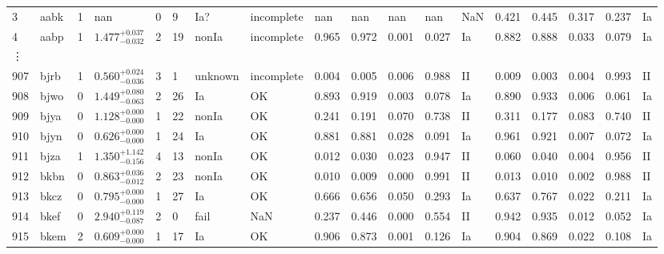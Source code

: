 \documentclass[useamsfonts]{pasj01}
\begin{document}
\begin{table}[ht]
{\begin{tabular}{p{1.5em}p{1em}p{1em}p{4.0em}p{1.5em}p{0.6em}p{3.0em}p{4.5em}|p{2.9em}|p{1.3em}p{1.3em}p{1.3em}p{1em}|p{2.9em}|p{1.3em}p{1.3em}p{1.3em}p{1em}}
3    &  aabk &     1 &      nan &         0 &    9 &    Ia? &   incomplete &      nan &      nan &      nan &      nan &     NaN &    0.421 &    0.445 &    0.317 &    0.237 &      Ia \\
4    &  aabp &     1 &    $1.477_{-0.032}^{+0.037}$ &         2 &   19 &  nonIa &   incomplete &    0.965 &    0.972 &    0.001 &    0.027 &      Ia &    0.882 &    0.888 &    0.033 &    0.079 &      Ia \\
\vdots & & & & & & & & & & & & & & & & &\\
907  &  bjrb &     1 &    $0.560_{-0.036}^{+0.024}$ &         3 &    1 &  unknown &   incomplete &    0.004 &    0.005 &    0.006 &    0.988 &      II &    0.009 &    0.003 &    0.004 &    0.993 &      II \\
908  &  bjwo &     0 &    $1.449_{-0.063}^{+0.080}$ &         2 &   26 &     Ia &     OK &    0.893 &    0.919 &    0.003 &    0.078 &      Ia &    0.890 &    0.933 &    0.006 &    0.061 &      Ia \\
909  &  bjya &     0 &    $1.128_{-0.000}^{+0.000}$ &         1 &   22 &  nonIa &     OK &    0.241 &    0.191 &    0.070 &    0.738 &      II &    0.311 &    0.177 &    0.083 &    0.740 &      II \\
910  &  bjyn &     0 &    $0.626_{-0.000}^{+0.000}$ &         1 &   24 &     Ia &     OK &    0.881 &    0.881 &    0.028 &    0.091 &      Ia &    0.961 &    0.921 &    0.007 &    0.072 &      Ia \\
911  &  bjza &     1 &    $1.350_{-0.156}^{+1.142}$ &         4 &   13 &  nonIa &     OK &    0.012 &    0.030 &    0.023 &    0.947 &      II &    0.060 &    0.040 &    0.004 &    0.956 &      II \\
912  &  bkbn &     0 &    $0.863_{-0.012}^{+0.036}$ &         2 &   23 &  nonIa &     OK &    0.010 &    0.009 &    0.000 &    0.991 &      II &    0.013 &    0.010 &    0.002 &    0.988 &      II \\
913  &  bkcz &     0 &    $0.795_{-0.000}^{+0.000}$ &         1 &   27 &     Ia &     OK &    0.666 &    0.656 &    0.050 &    0.293 &      Ia &    0.637 &    0.767 &    0.022 &    0.211 &      Ia \\
914  &  bkef &     0 &    $2.940_{-0.087}^{+0.119}$ &         2 &    0 &   fail &    NaN &    0.237 &    0.446 &    0.000 &    0.554 &      II &    0.942 &    0.935 &    0.012 &    0.052 &      Ia \\
915  &  bkem &     2 &    $0.609_{-0.000}^{+0.000}$ &         1 &   17 &     Ia &     OK &    0.906 &    0.873 &    0.001 &    0.126 &      Ia &    0.904 &    0.869 &    0.022 &    0.108 &      Ia \\

\end{tabular}}
\end{table}
\end{document}
